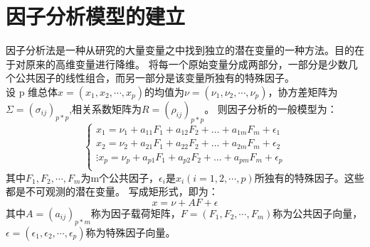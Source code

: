 \documentclass[a4paper]{article}
\begin{document}
\section{因子分析模型的建立}
因子分析法是一种从研究的大量变量之中找到独立的潜在变量的一种方法。目的在于对原来的高维变量进行降维。
将每一个原始变量分成两部分，一部分是少数几个公共因子的线性组合，而另一部分是该变量所独有的特殊因子。 \\
\indent 设 p 维总体$x=(x_1,x_2,\cdots,x_p)$的均值为$\nu=(\nu_1,\nu_2,\cdots,\nu_p)$，协方差矩阵为$\Sigma=(\sigma_{ij})_{p*p}$,相关系数矩阵为$R=(\rho_{ij})_{p*p}$。
则因子分析的一般模型为：
\begin{equation}
\left\{
\begin{aligned}
x_1=\nu_1+a_{11}F_1+a_{12}F_2+\dots+a_{1m}F_m+\epsilon_1    \\
x_2=\nu_2+a_{21}F_1+a_{22}F_2+\dots+a_{2m}F_m+\epsilon_2    \\
\vdots
x_p=\nu_p+a_{p1}F_1+a_{p2}F_2+\dots+a_{pm}F_m+\epsilon_p    \\
\end{aligned}
\right.
\end{equation}
其中$F_1,F_2,\cdots,F_m$为m个公共因子，$\epsilon_i$是$x_i(i=1,2,\cdots,p)$所独有的特殊因子。这些都是不可观测的潜在变量。
写成矩形式，即为：
\begin{equation}
x=\nu+AF+\epsilon
\end{equation}
其中$A=(a_{ij})_{p*m}$称为因子载荷矩阵，$F=(F_1,F_2,\cdots,F_m)$称为公共因子向量，$\epsilon=(\epsilon_1,\epsilon_2,\cdots,\epsilon_p)$称为特殊因子向量。
\end{document}
